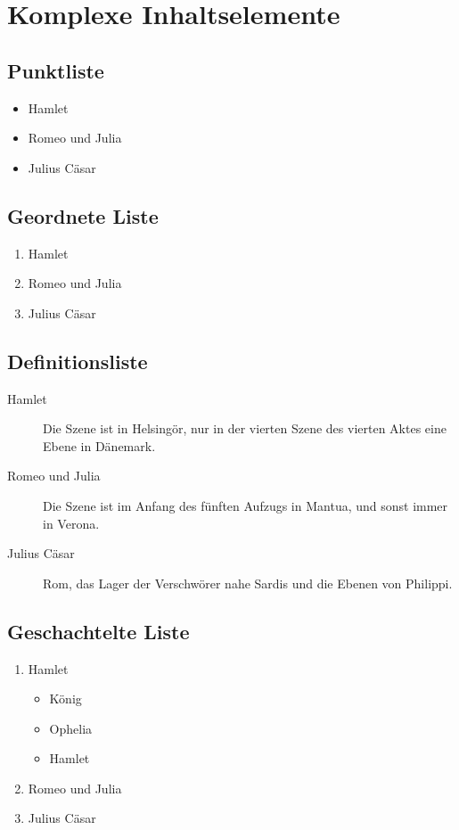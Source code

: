 
\chapter{Komplexe Inhaltselemente}

\section{Punktliste}

\begin{itemize}
  \item Hamlet
  \item Romeo und Julia
  \item Julius Cäsar
\end{itemize}

\section{Geordnete Liste}

\begin{enumerate}
  \item Hamlet
  \item Romeo und Julia
  \item Julius Cäsar
\end{enumerate}

\section{Definitionsliste}

\begin{description}
  \item [Hamlet] Die Szene ist in Helsingör, nur in der vierten Szene des
  vierten Aktes eine Ebene in Dänemark.
  \item [Romeo und Julia] Die Szene ist im Anfang des fünften Aufzugs in
  Mantua, und sonst immer in Verona.
  \item [Julius Cäsar] Rom, das Lager der Verschwörer nahe Sardis und die Ebenen
  von Philippi.
\end{description}

\section{Geschachtelte Liste}

\begin{enumerate}
\item Hamlet
  \begin{itemize}
  \item König
  \item Ophelia
  \item Hamlet
  \end{itemize}
\item Romeo und Julia
\item Julius Cäsar
\end{enumerate}

